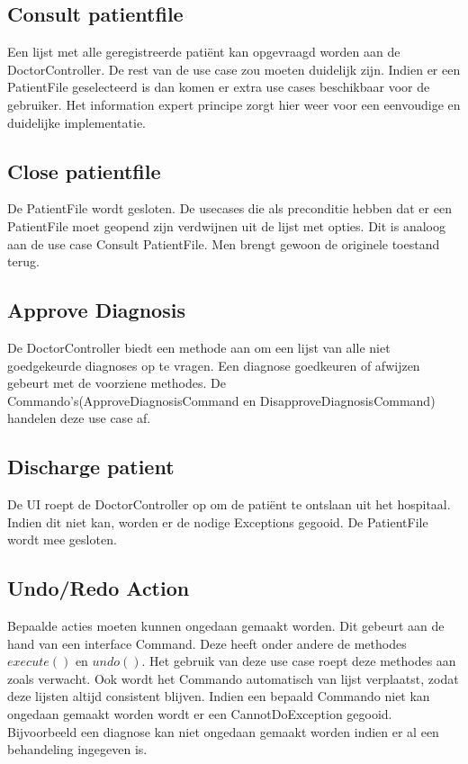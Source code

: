 \subsection{Consult patientfile}
Een lijst met alle geregistreerde patiënt kan opgevraagd worden aan de DoctorController. De rest van de use case zou moeten duidelijk zijn.
Indien er een PatientFile geselecteerd is dan komen er extra use cases beschikbaar voor de gebruiker.
Het information expert principe zorgt hier weer voor een eenvoudige en duidelijke implementatie.

\subsection{Close patientfile}
De PatientFile wordt gesloten. De usecases die als preconditie hebben dat er een PatientFile moet geopend zijn verdwijnen uit de lijst met opties. 
Dit is analoog aan de use case Consult PatientFile. 
Men brengt gewoon de originele toestand terug.

\subsection{Approve Diagnosis}
De DoctorController biedt een methode aan om een lijst van alle niet goedgekeurde diagnoses op te vragen. 
Een diagnose goedkeuren of afwijzen gebeurt met de voorziene methodes. 
De Commando's(ApproveDiagnosisCommand en DisapproveDiagnosisCommand) handelen deze use case af. 

\subsection{Discharge patient}
De UI roept de DoctorController op om de patiënt te ontslaan uit het hospitaal. 
Indien dit niet kan, worden er de nodige Exceptions gegooid.
De PatientFile wordt mee gesloten.

\subsection{Undo/Redo Action}
Bepaalde acties moeten kunnen ongedaan gemaakt worden. Dit gebeurt aan de hand van een interface Command. 
Deze heeft onder andere de methodes $execute()$ en $undo()$. 
Het gebruik van deze use case roept deze methodes aan zoals verwacht. 
Ook wordt het Commando automatisch van lijst verplaatst, zodat deze lijsten altijd consistent blijven.
Indien een bepaald Commando niet kan ongedaan gemaakt worden wordt er een CannotDoException gegooid. 
Bijvoorbeeld een diagnose kan niet ongedaan gemaakt worden indien er al een behandeling ingegeven is.


